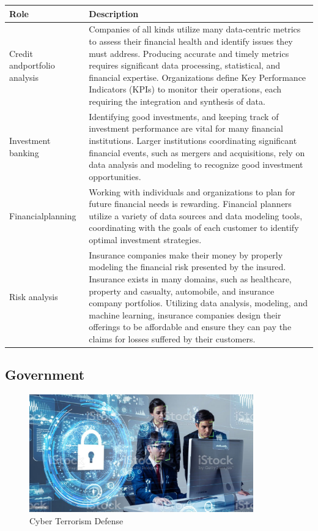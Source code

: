 \begin{table}[H]
	\begin{center}
		\begin{tabular}{p{1in}|p{3.4in}} 
			\textbf{Role} & \textbf{Description}\\
			\hline
			Credit and\linebreak portfolio analysis & Companies of all kinds utilize many data-centric metrics to assess their financial health and identify issues they must address. Producing accurate and timely metrics requires significant data processing, statistical, and financial expertise. Organizations define Key Performance Indicators (KPIs) to monitor their operations, each requiring the integration and synthesis of data.\\
			\hline
			Investment banking & Identifying good investments, and keeping track of investment performance are vital for many financial institutions. Larger institutions coordinating significant financial events, such as mergers and acquisitions, rely on data analysis and modeling to recognize good investment opportunities.\\
			\hline
			Financial\linebreak planning & Working with individuals and organizations to plan for future financial needs is rewarding. Financial planners utilize a variety of data sources and data modeling tools, coordinating with the goals of each customer to identify optimal investment strategies.\\
			\hline
			Risk analysis & Insurance companies make their money by properly modeling the financial risk presented by the insured. Insurance exists in many domains, such as healthcare, property and casualty, automobile, and insurance company portfolios. Utilizing data analysis, modeling, and machine learning, insurance companies design their offerings to be affordable and ensure they can pay the claims for losses suffered by their customers.\\
			\hline
		\end{tabular}
	\end{center}
\end{table}

\subsection{Government}

\begin{figure}[H]
	\begin{center}
		\caption{Cyber Terrorism Defense}
		\vskip 4pt
		\includegraphics[height=2in]{images/careers/istockphoto-1169668290-1024x1024.jpg}
	\end{center}
\end{figure}

